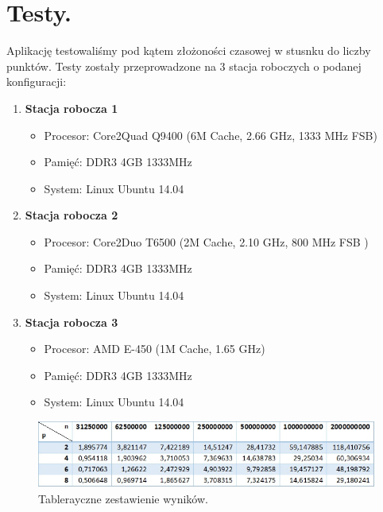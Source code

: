 \documentclass[a4paper,12pt]{article}		%
\begin{document}
\section{Testy.}

Aplikację testowaliśmy pod kątem złożoności czasowej w stusnku do liczby punktów. Testy zostały przeprowadzone na 3 stacja roboczych o podanej konfiguracji:

\begin{enumerate}
\item \textbf{Stacja robocza 1}
\begin{itemize}
\item Procesor: Core2Quad Q9400 (6M Cache, 2.66 GHz, 1333 MHz FSB)
\item Pamięć: DDR3 4GB 1333MHz
\item System: Linux Ubuntu 14.04
\end{itemize}
\item \textbf{Stacja robocza 2}
\begin{itemize}
\item Procesor: Core2Duo T6500 (2M Cache, 2.10 GHz, 800 MHz FSB ) 
\item Pamięć: DDR3 4GB 1333MHz
\item System: Linux Ubuntu 14.04
\end{itemize}
\item \textbf{Stacja robocza 3}
\begin{itemize}
\item Procesor: AMD E-450 (1M Cache, 1.65 GHz)
\item Pamięć: DDR3 4GB 1333MHz
\item System: Linux Ubuntu 14.04
\end{itemize}
\end{enumerate}

\begin{center}
\begin{figure}[h!]
\centering
\includegraphics[scale=0.85]{Resources/tabela.jpg}
\caption{Tablerayczne zestawienie wyników.} 
\end{figure} 
\end{center}
\end{document}
